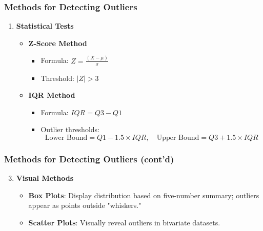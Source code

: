 \documentclass[aspectratio=169]{beamer}
\begin{document}
\begin{frame}
  \frametitle{Methods for Detecting Outliers}
  \begin{enumerate}
    \item \textbf{Statistical Tests}
      \begin{itemize}
        \item \textbf{Z-Score Method}
          \begin{itemize}
            \item Formula: \( Z = \frac{(X - \mu)}{\sigma} \)
            \item Threshold: \(|Z| > 3\)
          \end{itemize}
        \item \textbf{IQR Method}
          \begin{itemize}
            \item Formula: \( IQR = Q3 - Q1 \)
            \item Outlier thresholds: 
              \[
              \text{Lower Bound} = Q1 - 1.5 \times IQR, \quad \text{Upper Bound} = Q3 + 1.5 \times IQR
              \]
          \end{itemize}
      \end{itemize}
  \end{enumerate}
\end{frame}

\begin{frame}
  \frametitle{Methods for Detecting Outliers (cont'd)}
  \begin{enumerate}
    \setcounter{enumi}{2} %
    \item \textbf{Visual Methods}
      \begin{itemize}
        \item \textbf{Box Plots}: Display distribution based on five-number summary; outliers appear as points outside "whiskers."
        \item \textbf{Scatter Plots}: Visually reveal outliers in bivariate datasets.
      \end{itemize}
  \end{enumerate}
\end{frame}
\end{document}

